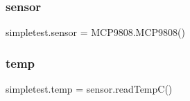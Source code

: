 \subsubsection{\texorpdfstring{sensor}{sensor}}
{\footnotesize\ttfamily simpletest.\+sensor = M\+C\+P9808.\+M\+C\+P9808()}

\mbox{\label{namespacesimpletest_a6738c5386c131a338502cdf02427e968}} 
\subsubsection{\texorpdfstring{temp}{temp}}
{\footnotesize\ttfamily simpletest.\+temp = sensor.\+read\+TempC()}

